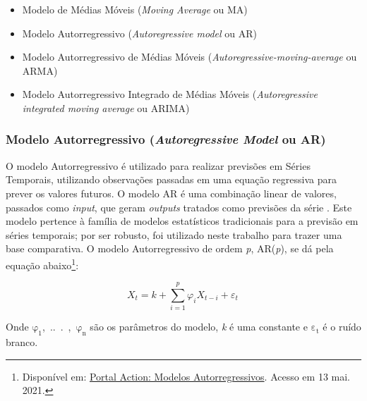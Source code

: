\begin{itemize}
\item{Modelo de Médias Móveis (\textit{Moving Average} ou MA)}
\item{Modelo Autorregressivo (\textit{Autoregressive model} ou AR)}
\item{Modelo Autorregressivo de Médias Móveis (\textit{Autoregressive-moving-average} ou ARMA)}
\item{Modelo Autorregressivo Integrado de Médias Móveis (\textit{Autoregressive integrated moving average} ou ARIMA)}
\end{itemize}

\subsubsection{Modelo Autorregressivo (\textit{Autoregressive Model} ou AR)}

O modelo Autorregressivo é utilizado para realizar previsões em Séries Temporais, utilizando observações passadas em uma equação regressiva para prever os valores futuros. O modelo AR é uma combinação linear de valores, passados como \textit{input}, que geram \textit{outputs} tratados como previsões da série \cite{jason}. Este modelo pertence à família de modelos estatísticos tradicionais para a previsão em séries temporais; por ser robusto, foi utilizado neste trabalho para trazer uma base comparativa. O modelo Autorregressivo de ordem \textit{p}, AR(\textit{p}), se dá pela equação abaixo\footnote{Disponível em: \href{http://www.portalaction.com.br/series-temporais/41-modelos-autorregressivos-ar}{Portal Action: Modelos Autorregressivos}. Acesso em 13 mai. 2021.}:

\begin{equation}
X_{t}=k+\sum _{{i=1}}^{p}\varphi _{i}X_{{t-i}}+\varepsilon _{t}\,
\end{equation}

Onde $\mathrm{\varphi_{1}}$,\ ..\ .\ ,\ $\mathrm{\varphi_{n}}$ são os parâmetros do modelo, \textit{k} é uma constante e $\mathrm{\varepsilon_t}$ é o ruído branco. 


